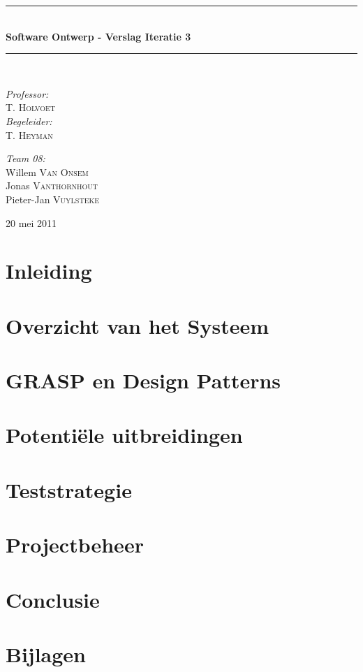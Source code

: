 \documentclass[a4paper,titlepage]{article}
\newcommand{\HRule}{\rule{\linewidth}{0.5mm}}
\begin{document}
\begin{empfile}
\begin{titlepage}
\begin{center}
\HRule \\[0.4cm]
{ \huge \bfseries Software Ontwerp - Verslag Iteratie 3}\\[0.4cm]
\HRule \\[1.5cm]
\begin{minipage}{0.4\textwidth}
\begin{flushleft} \large
\emph{Professor:}\\
T. \textsc{Holvoet}\\
\emph{Begeleider:}\\
T. \textsc{Heyman}
\end{flushleft}
\end{minipage}
\begin{minipage}{0.4\textwidth}
\begin{flushright} \large
\emph{Team 08:} \\
Willem \textsc{Van Onsem}\\
Jonas \textsc{Vanthornhout}\\
Pieter-Jan \textsc{Vuylsteke}
\end{flushright}
\end{minipage}

\vfill

{\large 20 mei 2011}
\end{center}
\end{titlepage}
\tableofcontents
\newpage
\section*{Inleiding}

\newpage
\section{Overzicht van het Systeem}

\section{GRASP en Design Patterns}

\section{Potenti\"ele uitbreidingen}

\section{Teststrategie}

\section{Projectbeheer}

\section{Conclusie}

\newpage
\appendix
\section{Bijlagen}

\end{empfile}
\end{document}
